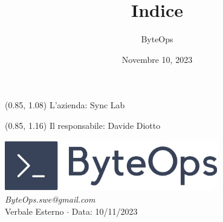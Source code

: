 \documentclass{article}
\title{\textbf{\fontsize{28}{6}\selectfont Indice}}
\author{\fontsize{14}{6}\selectfont ByteOps}
\date{Novembre 10, 2023}
\begin{document}

\begin{textblock*}{\textwidth}(0.85\textwidth, 1.08\textheight)
L'azienda: Sync Lab
\end{textblock*}

\begin{textblock*}{\textwidth}(0.85\textwidth, 1.16\textheight)
Il responsabile: Davide Diotto
\end{textblock*}


\pagestyle{fancy}
\begin{center}
\includegraphics[width = 0.7\textwidth]{../../../Images/logo.png} \\
\vspace{0.2cm}
\textcolor[RGB]{60, 60, 60}{\textit{ByteOps.swe@gmail.com}} \\
\vspace{1cm}
\fontsize{16}{6}\selectfont Verbale Esterno $\cdot$ Data: 10/11/2023 \\
\vspace{0.5cm}
\end{center}
\end{document}
